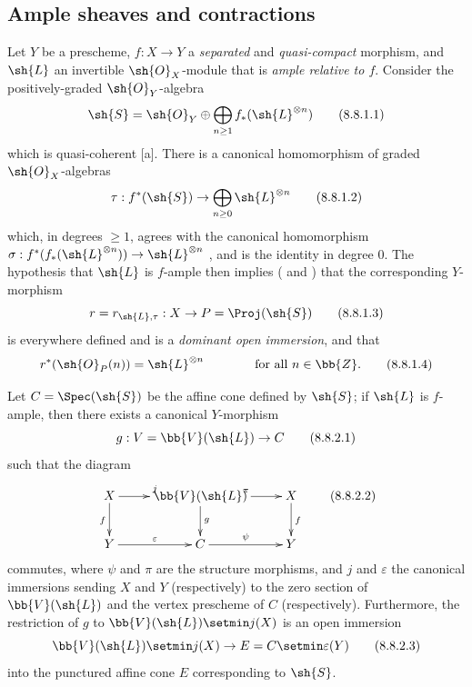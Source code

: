 \subsection{Ample sheaves and contractions}
\label{subsection:II.8.8}

\begin{env}[8.8.1]
\label{II.8.8.1}
Let $Y$ be a prescheme, $f:X\to Y$ a \emph{separated} and \emph{quasi-compact} morphism, and $\sh{L}$ an invertible $\sh{O}_X$-module that is \emph{ample relative to $f$}.
Consider the positively-graded $\sh{O}_Y$-algebra
\[
\label{II.8.8.1.1}
  \sh{S} = \sh{O}_Y \oplus \bigoplus_{n\geq1}f_*(\sh{L}^{\otimes n})
\tag{8.8.1.1}
\]
which is quasi-coherent [a].
There is a canonical homomorphism of graded $\sh{O}_X$-algebras
\[
\label{II.8.8.1.2}
  \tau: f^*(\sh{S}) \to \bigoplus_{n\geq0}\sh{L}^{\otimes n}
\tag{8.8.1.2}
\]
which, in degrees $\geq1$, agrees with the canonical homomorphism $\sigma:f^*(f_*(\sh{L}^{\otimes n})) \to \sh{L}^{\otimes n}$ , and is the identity in degree 0.
The hypothesis that $\sh{L}$ is $f$-ample then implies ( and ) that the corresponding $Y$-morphism
\[
\label{II.8.8.1.3}
  r = r_{\sh{L},\tau} : X \to P = \Proj(\sh{S})
\tag{8.8.1.3}
\]
is everywhere defined and is a \emph{dominant open immersion}, and that
\[
\label{II.8.8.1.4}
  r^*(\sh{O}_P(n)) = \sh{L}^{\otimes n}
  \qquad\qquad
  \mbox{for all $n\in\bb{Z}$.}
\tag{8.8.1.4}
\]
\end{env}

\begin{proposition}[8.8.2]
\label{II.8.8.2}
Let $C=\Spec(\sh{S})$ be the affine cone defined by $\sh{S}$;
if $\sh{L}$ is $f$-ample, then there exists a canonical $Y$-morphism
\[
\label{II.8.8.2.1}
  g : V = \bb{V}(\sh{L}) \to C
\tag{8.8.2.1}
\]
such that the diagram
\[
\label{II.8.8.2.2}
  \xymatrix{
    X
      \ar[r]^{j}
      \ar[d]_{f}
  & \bb{V}(\sh{L})
      \ar[r]^{\pi}
      \ar[d]^{g}
  & X
      \ar[d]^{f}
  \\Y
      \ar[r]^{\varepsilon}
  & C
      \ar[r]^{\psi}
  & Y
  }
  \tag{8.8.2.2}
\]
commutes, where $\psi$ and $\pi$ are the structure morphisms, and $j$ and $\varepsilon$ the canonical immersions sending $X$ and $Y$ (respectively) to the zero section of $\bb{V}(\sh{L})$ and the vertex prescheme of $C$ (respectively).
Furthermore, the restriction of $g$ to $\bb{V}(\sh{L})\setmin j(X)$ is an open immersion
\[
\label{II.8.8.2.3}
  \bb{V}(\sh{L})\setmin j(X)\to E=C\setmin\varepsilon(Y)
  \tag{8.8.2.3}
\]
into the punctured affine cone $E$ corresponding to $\sh{S}$.
\end{proposition}

